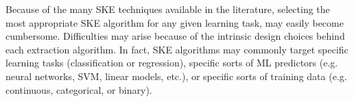 \documentclass[
]{ceurart}
\begin{document}
Because of the many SKE techniques available in the literature, selecting the most appropriate SKE algorithm for any given learning task, may easily become cumbersome.
%
Difficulties may arise because of the intrinsic design choices behind each extraction algorithm.
%
In fact, SKE algorithms may commonly target specific learning tasks (classification or regression), specific sorts of ML predictors (e.g. neural networks, SVM, linear models, etc.), or specific sorts of training data (e.g. continuous, categorical, or binary).
%
%
\end{document}
